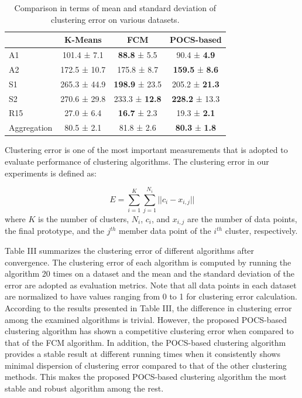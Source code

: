 \documentclass[conference]{IEEEtran}
\begin{document}
\begin{table}[t]
\caption{Comparison in terms of mean and standard deviation of clustering error on various datasets.}
\setlength\tabcolsep{0pt} %
\begin{tabular*}{\columnwidth}{@{\extracolsep{\fill}} lccc}

\toprule
      & \textbf{K-Means} & \textbf{FCM} & \textbf{POCS-based} \\

\midrule
     A1  & 101.4 ± 7.1 & \textbf{88.8} ± 5.5 & 90.4 ± \textbf{4.9} \\
     A2  & 172.5 ± 10.7 & 175.8 ± 8.7 & \textbf{159.5} ± \textbf{8.6} \\
     S1  & 265.3 ± 44.9 & \textbf{198.9} ± 23.5 & 205.2 ± \textbf{21.3} \\
     S2  & 270.6 ± 29.8 & 233.3 ± \textbf{12.8} & \textbf{228.2} ± 13.3 \\
     R15 & 27.0 ± 6.4 & \textbf{16.7} ± 2.3 & 19.3 ± \textbf{2.1} \\
     Aggregation & 80.5 ± 2.1 & 81.8 ± 2.6 & \textbf{80.3} ± \textbf{1.8} \\

\bottomrule
\end{tabular*}
\end{table}


Clustering error is one of the most important measurements that is adopted to evaluate performance of clustering algorithms. The clustering error in our experiments is defined as:

\begin{equation}
E = \sum_{i=1}^{K} \sum_{j=1}^{N_i} ||c_i - x_{i,j} ||  \label{eq14}
\end{equation} where $K$ is the number of clusters, $N_i$, $c_i$, and $x_{i,j}$ are the number of data points, the final prototype, and the $j^{th}$ member data point of the $i^{th}$ cluster, respectively.

Table III summarizes the clustering error of different algorithms after convergence. The clustering error of each algorithm is computed by running the algorithm 20 times on a dataset and the mean and the standard deviation of the error are adopted as evaluation metrics. Note that all data points in each dataset are normalized to have values ranging from 0 to 1 for clustering error calculation. According to the results presented in Table III, the difference in clustering error among the examined algorithms is trivial. However, the proposed POCS-based clustering algorithm has shown a competitive clustering error when compared to that of the FCM algorithm. In addition, the POCS-based clustering algorithm provides a stable result at different running times when it consistently shows minimal dispersion of clustering error compared to that of the other clustering methods. This makes the proposed POCS-based clustering algorithm the most stable and robust algorithm among the rest.
\end{document}
